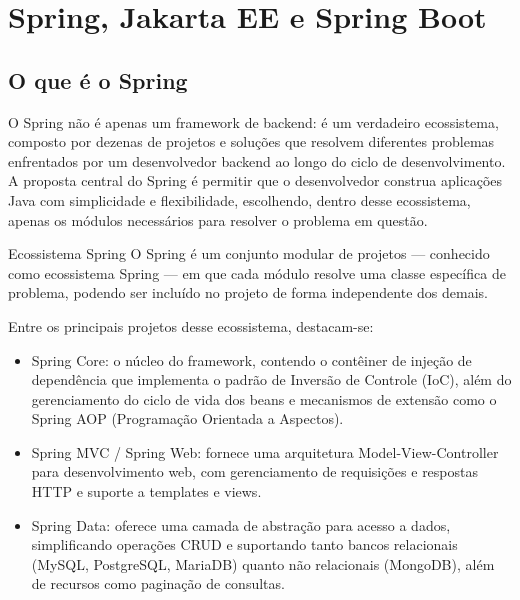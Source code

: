 \chapter{Spring, Jakarta EE e Spring Boot}

\section{O que é o Spring}

O Spring não é apenas um framework de backend: é um verdadeiro ecossistema, composto por dezenas de projetos e soluções que resolvem diferentes problemas enfrentados por um desenvolvedor backend ao longo do ciclo de desenvolvimento. A proposta central do Spring é permitir que o desenvolvedor construa aplicações Java com simplicidade e flexibilidade, escolhendo, dentro desse ecossistema, apenas os módulos necessários para resolver o problema em questão.

\begin{infobox}{Ecossistema Spring}
O Spring é um conjunto modular de projetos — conhecido como ecossistema Spring — em que cada módulo resolve uma classe específica de problema, podendo ser incluído no projeto de forma independente dos demais.
\end{infobox}

Entre os principais projetos desse ecossistema, destacam-se:

\begin{itemize}
  \item Spring Core: o núcleo do framework, contendo o contêiner de injeção de dependência que implementa o padrão de Inversão de Controle (IoC), além do gerenciamento do ciclo de vida dos beans e mecanismos de extensão como o Spring AOP (Programação Orientada a Aspectos).
\end{itemize}

\begin{itemize}
  \item Spring MVC / Spring Web: fornece uma arquitetura Model-View-Controller para desenvolvimento web, com gerenciamento de requisições e respostas HTTP e suporte a templates e views.
\end{itemize}

\begin{itemize}
  \item Spring Data: oferece uma camada de abstração para acesso a dados, simplificando operações CRUD e suportando tanto bancos relacionais (MySQL, PostgreSQL, MariaDB) quanto não relacionais (MongoDB), além de recursos como paginação de consultas.
\end{itemize}


